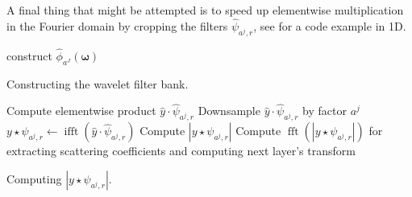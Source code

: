 \documentclass[twocolumn, openany, oneside, article]{memoir}
\DeclareMathOperator{\ifft}{ifft}
\DeclareMathOperator{\fft}{fft}
\begin{document}
A final thing that might be attempted is to speed up elementwise multiplication
in the Fourier domain by cropping the filters $\hat{\psi}_{a^j, r}$, see \cite{ifftmultiply}
for a code example in 1D.

\begin{algorithm}
construct $\hat{\phi}_{a^J}(\bm{\omega})$\;
\caption{Constructing the wavelet filter bank.}\label{algorithm:filterbank}
\end{algorithm}

\begin{algorithm}
  Compute elementwise product $\hat{y} \cdot \hat{\psi}_{a^j, r}$\;
  Downsample $\hat{y} \cdot \hat{\psi}_{a^j, r}$ by factor $a^j$\;
  $y \star \psi_{a^j, r} \leftarrow \ifft(\hat{y} \cdot \hat{\psi}_{a^j, r})$\;
  Compute $|y \star \psi_{a^j, r}|$\;
  Compute $\fft(|y \star \psi_{a^j, r}|)$ for extracting scattering coefficients and computing next layer's transform\;
  \caption{Computing $|y \star \psi_{a^j, r}|$.}\label{algorithm:scattering_operator}
\end{algorithm}
\end{document}
